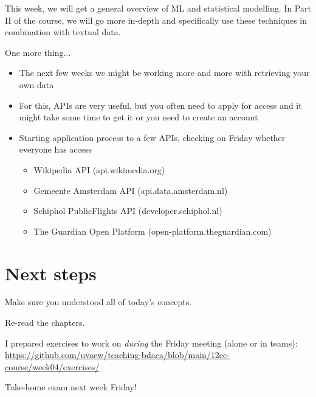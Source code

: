 \documentclass[compress]{beamer}
\begin{document}
\begin{frame}[standout]
This week, we will get a general overview of ML and statistical modelling. In Part II of the course, we will go more in-depth and specifically use these techniques in combination with textual data.
\end{frame}















\begin{frame}{One more thing...}
	\begin{itemize}
		\item The next few weeks we might be working more and more with retrieving your own data
		\item For this, APIs are very useful, but you often need to apply for access and it might take some time to get it or you need to create an account
		\item Starting application process to a few APIs, checking on Friday whether everyone has access 
		\begin{itemize}
			\item Wikipedia API (api.wikimedia.org)
			\item Gemeente Amsterdam API (api.data.amsterdam.nl)
			\item Schiphol PublicFlights API (developer.schiphol.nl)
			\item The Guardian Open Platform (open-platform.theguardian.com)
		\end{itemize}
	\end{itemize}
\end{frame}

\section{Next steps}

\begin{frame}[standout]
Make sure you understood all of today's concepts.

Re-read the chapters.

I prepared exercises to work on \emph{during} the Friday meeting (alone or in teams):
\large{\url{https://github.com/uvacw/teaching-bdaca/blob/main/12ec-course/week04/exercises/}}
\end{frame}


\begin{frame}[standout]
Take-home exam next week Friday!
\end{frame}





\begin{frame}
	\printbibliography
\end{frame}
\end{document}
